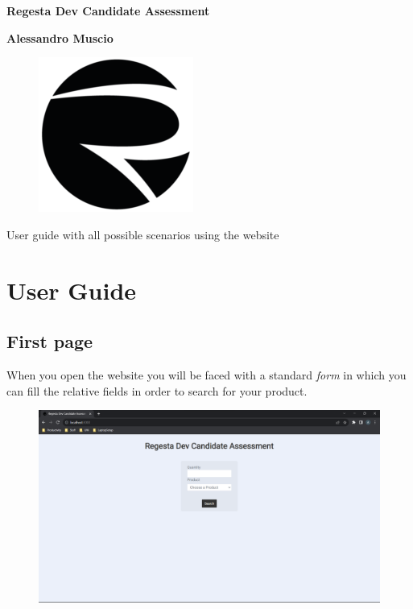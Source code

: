 \documentclass[11pt]{article}
\begin{document}
  \begin{titlepage}
    \vspace*{\fill}
    \centering

    \textbf{\Huge Regesta Dev Candidate Assessment}
    \vspace*{1.5cm}

    \textbf{\LARGE Alessandro Muscio}
    \vspace*{0.8cm}

    \begin{figure}[h]
      \centering
      \includegraphics[]{../public/cropped-v2-icona-regesta-1-192x192.png}
    \end{figure}

    \Large User guide with all possible scenarios using the website

    \vspace*{\fill}
  \end{titlepage}

  \section*{User Guide}
  \subsection*{First page}
  When you open the website you will be faced with a standard \textit{form} in which you can fill the relative fields in order to search for your product.

  \begin{figure}[h]
    \centering
    \includegraphics[scale=0.4433]{images/01.png}
  \end{figure}
\end{document}

